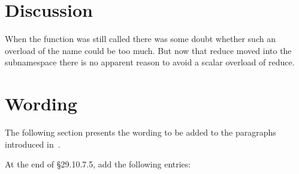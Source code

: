 \section{Discussion}

When the function was still called 
there was some doubt whether such an overload of the name could be too much.
But now that reduce moved into the subnamespace 
there is no apparent reason to avoid a scalar overload of reduce.

\section{Wording}\label{sec:wording}

The following section presents the wording to be added to the paragraphs introduced in~\cite{P1928R15}.

At the end of §29.10.7.5, add the following entries:
\begin{wgText}
  
\end{wgText}


